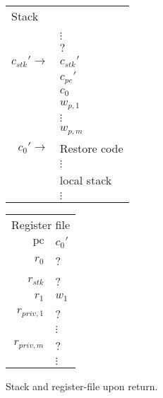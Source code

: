 \documentclass[a4paper]{article}
\newcommand{\var}[1]{\mathit{#1}}
\newcommand{\pc}{\mathit{pc}}
\newcommand{\pcreg}{\mathrm{pc}}
\begin{document}
\begin{figure}
  \label{fig:stack-upon-return}
  \centering
  \begin{tabular}[!h]{r | >{\raggedright\arraybackslash}p{3cm} |}
\multicolumn{2}{l}{Stack} \\
\cline{2-2}
   & \\
   & $\vdots$\\
\cline{2-2} 
   & $?$\\
\cline{2-2} 
$c_{\var{stk}}' \rightarrow$  & $c_{\var{stk}}'$ \\
\cline{2-2}
   & $c_\pc'$ \\
\cline{2-2}
   & $c_0$ \\
\cline{2-2}
   & $w_{p,1}$ \\
\cline{2-2}
   & $\vdots$ \\
\cline{2-2}
   & $w_{p,m}$ \\
\cline{2-2}
$c_0' \rightarrow$   & Restore code \\
   & $\vdots$\\
\cline{2-2}
   & local stack\\
   & $\vdots$\\
\cline{2-2}
\end{tabular}
\hspace{1cm}
\begin{tabular}{r | >{\centering\arraybackslash}p{0.75cm} |}
\multicolumn{2}{r}{Register file} \\
\cline{2-2}
$\pcreg$ & $c_0'$\\
\cline{2-2}
$r_0$  &  ? \\
\cline{2-2}
$r_{\var{stk}}$  & ? \\
\cline{2-2}
$r_1$ & $w_1$ \\
\cline{2-2}
$r_{\var{priv},1}$ & ?\\
\cline{2-2}
& $\vdots$ \\
\cline{2-2}
$r_{\var{priv},m}$ & ? \\
\cline{2-2}
& $\vdots$ \\
\cline{2-2}
\end{tabular}
\caption{ Stack and register-file upon return. }
\end{figure}
\end{document}
